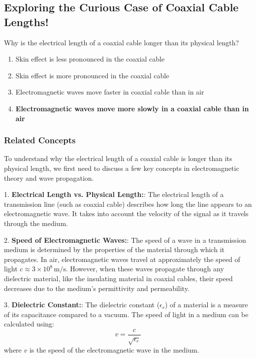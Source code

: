 \subsection{Exploring the Curious Case of Coaxial Cable Lengths!}

\begin{tcolorbox}[colback=gray!10, colframe=black, title=E9F03] 

Why is the electrical length of a coaxial cable longer than its physical length?  
\begin{enumerate}[label=\Alph*.]
    \item Skin effect is less pronounced in the coaxial cable
    \item Skin effect is more pronounced in the coaxial cable
    \item Electromagnetic waves move faster in coaxial cable than in air
    \item \textbf{Electromagnetic waves move more slowly in a coaxial cable than in air}
\end{enumerate} \end{tcolorbox}

\subsubsection*{Related Concepts}

To understand why the electrical length of a coaxial cable is longer than its physical length, we first need to discuss a few key concepts in electromagnetic theory and wave propagation.

1. \textbf{Electrical Length vs. Physical Length:}: 
   The electrical length of a transmission line (such as coaxial cable) describes how long the line appears to an electromagnetic wave. It takes into account the velocity of the signal as it travels through the medium.

2. \textbf{Speed of Electromagnetic Waves:}: 
   The speed of a wave in a transmission medium is determined by the properties of the material through which it propagates. In air, electromagnetic waves travel at approximately the speed of light \( c \approx 3 \times 10^8 \, \text{m/s} \). However, when these waves propagate through any dielectric material, like the insulating material in coaxial cables, their speed decreases due to the medium's permittivity and permeability.

3. \textbf{Dielectric Constant:}: 
   The dielectric constant (\( \epsilon_r \)) of a material is a measure of its capacitance compared to a vacuum. The speed of light in a medium can be calculated using:
   \[
   v = \frac{c}{\sqrt{\epsilon_r}}
   \]
   where \( v \) is the speed of the electromagnetic wave in the medium.


